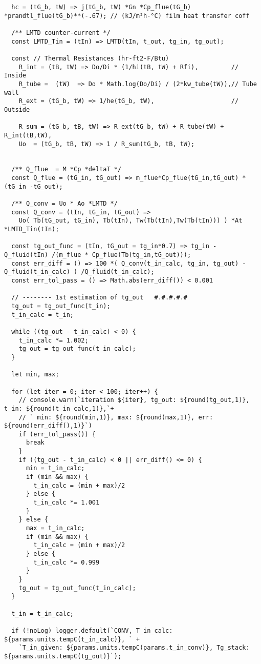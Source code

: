 \begin{verbatim}
  hc = (tG_b, tW) => j(tG_b, tW) *Gn *Cp_flue(tG_b) *prandtl_flue(tG_b)**(-.67); // (kJ/m²h-°C) film heat transfer coff

  /** LMTD counter-current */
  const LMTD_Tin = (tIn) => LMTD(tIn, t_out, tg_in, tg_out);

  const // Thermal Resistances (hr-ft2-F/Btu)
    R_int = (tB, tW) => Do/Di * (1/hi(tB, tW) + Rfi),         // Inside
    R_tube =  (tW)  => Do * Math.log(Do/Di) / (2*kw_tube(tW)),// Tube wall
    R_ext = (tG_b, tW) => 1/he(tG_b, tW),                     // Outside

    R_sum = (tG_b, tB, tW) => R_ext(tG_b, tW) + R_tube(tW) + R_int(tB,tW),
    Uo  = (tG_b, tB, tW) => 1 / R_sum(tG_b, tB, tW);


  /** Q_flue  = M *Cp *deltaT */
  const Q_flue = (tG_in, tG_out) => m_flue*Cp_flue(tG_in,tG_out) *(tG_in -tG_out);

  /** Q_conv = Uo * Ao *LMTD */
  const Q_conv = (tIn, tG_in, tG_out) =>
    Uo( Tb(tG_out, tG_in), Tb(tIn), Tw(Tb(tIn),Tw(Tb(tIn))) ) *At *LMTD_Tin(tIn);

  const tg_out_func = (tIn, tG_out = tg_in*0.7) => tg_in - Q_fluid(tIn) /(m_flue * Cp_flue(Tb(tg_in,tG_out)));
  const err_diff = () => 100 *( Q_conv(t_in_calc, tg_in, tg_out) - Q_fluid(t_in_calc) ) /Q_fluid(t_in_calc);
  const err_tol_pass = () => Math.abs(err_diff()) < 0.001
  
  // -------- 1st estimation of tg_out   #.#.#.#.#
  tg_out = tg_out_func(t_in);
  t_in_calc = t_in;

  while ((tg_out - t_in_calc) < 0) {
    t_in_calc *= 1.002;
    tg_out = tg_out_func(t_in_calc);
  }

  let min, max;

  for (let iter = 0; iter < 100; iter++) {
    // console.warn(`iteration ${iter}, tg_out: ${round(tg_out,1)}, t_in: ${round(t_in_calc,1)},`+
    // ` min: ${round(min,1)}, max: ${round(max,1)}, err: ${round(err_diff(),1)}`)
    if (err_tol_pass()) {
      break
    }
    if ((tg_out - t_in_calc) < 0 || err_diff() <= 0) {
      min = t_in_calc;
      if (min && max) {
        t_in_calc = (min + max)/2
      } else {
        t_in_calc *= 1.001
      }
    } else {
      max = t_in_calc;
      if (min && max) {
        t_in_calc = (min + max)/2
      } else {
        t_in_calc *= 0.999
      }
    }
    tg_out = tg_out_func(t_in_calc);
  }
  
  t_in = t_in_calc;

  if (!noLog) logger.default(`CONV, T_in_calc: ${params.units.tempC(t_in_calc)}, ` +
    `T_in_given: ${params.units.tempC(params.t_in_conv)}, Tg_stack: ${params.units.tempC(tg_out)}`);


\end{verbatim}
